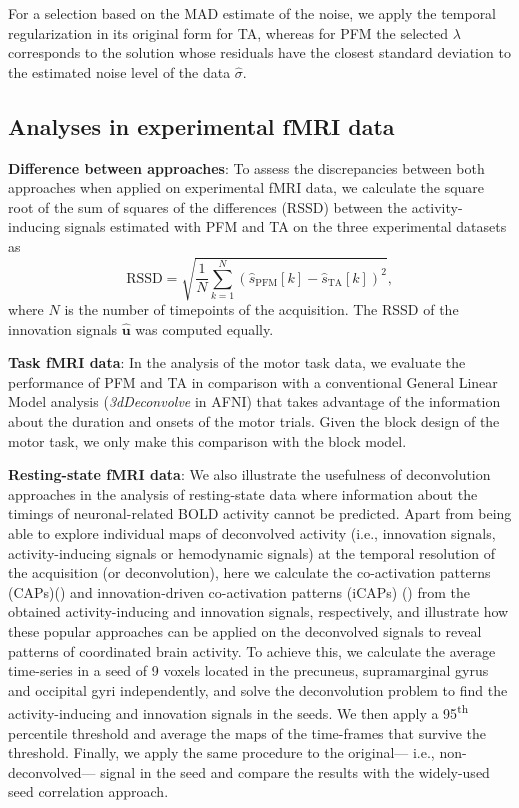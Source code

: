For a selection based on the MAD estimate of the noise, we apply the temporal regularization in its original form for TA, whereas for PFM the selected $\lambda$ corresponds to the solution whose residuals have the closest standard deviation to the estimated noise level of the data $\hat{\sigma}$.  %

\subsection{Analyses in experimental fMRI data}

\textbf{Difference between approaches}: To assess the discrepancies between both approaches when applied on experimental fMRI data, we calculate the square root of the sum of squares of the differences (RSSD) between the activity-inducing signals estimated with PFM and TA on the three experimental datasets as
\begin{equation}
    \text{RSSD} = \sqrt{\frac{1}{N} \sum_{k=1}^N (\hat{s}_\text{PFM}[k] - \hat{s}_\text{TA}[k])^2},
\end{equation}
where $N$ is the number of timepoints of the acquisition. The RSSD of the innovation signals $\mathbf{\hat{u}}$ was computed equally.

\textbf{Task fMRI data}: In the analysis of the motor task data, we evaluate the performance of PFM and TA in comparison with a conventional General Linear Model analysis (\textit{3dDeconvolve} in AFNI) that takes advantage of the information about the duration and onsets of the motor trials. Given the block design of the motor task, we only make this comparison with the block model.

\textbf{Resting-state fMRI data}: We also illustrate the usefulness of deconvolution approaches in the analysis of resting-state data where information about the timings of neuronal-related BOLD activity cannot be predicted. Apart from being able to explore individual maps of deconvolved activity (i.e., innovation signals, activity-inducing signals or hemodynamic signals) at the temporal resolution of the acquisition (or deconvolution), here we calculate the co-activation patterns (CAPs)(\citealt{Tagliazucchi2012,Liu2018Coactivationpatterns}) and innovation-driven co-activation patterns (iCAPs) (\citealt{Karahanoglu2015Transientbrainactivity}) from the obtained activity-inducing and innovation signals, respectively, and illustrate how these popular approaches can be applied on the deconvolved signals to reveal patterns of coordinated brain activity. To achieve this, we calculate the average time-series in a seed of 9 voxels located in the precuneus, supramarginal gyrus and occipital gyri independently, and solve the deconvolution problem to find the activity-inducing and innovation signals in the seeds. We then apply a 95\textsuperscript{th} percentile threshold and average the maps of the time-frames that survive the threshold. Finally, we apply the same procedure to the original--- i.e., non-deconvolved--- signal in the seed and compare the results with the widely-used seed correlation approach.